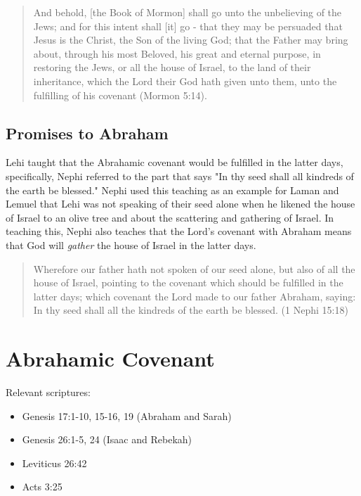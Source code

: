\begin{quotation}
And behold, [the Book of Mormon] shall go unto the unbelieving of the Jews; and for this intent shall [it] go - that they may be persuaded that Jesus is the Christ, the Son of the living God; that the Father may bring about, through his most Beloved, his great and eternal purpose, in restoring the Jews, or all the house of Israel, to the land of their inheritance, which the Lord their God hath given unto them, unto the fulfilling of his covenant (Mormon 5:14).
\end{quotation}

\subsection{Promises to Abraham}

Lehi taught that the Abrahamic covenant would be fulfilled in the latter days, specifically, Nephi referred to the part that says "In thy seed shall all kindreds of the earth be blessed." Nephi used this teaching as an example for Laman and Lemuel that Lehi was not speaking of their seed alone when he likened the house of Israel to an olive tree and about the scattering and gathering of Israel. In teaching this, Nephi also teaches that the Lord's covenant with Abraham means that God will \textit{gather} the house of Israel in the latter days.

\begin{quotation}
Wherefore our father hath not spoken of our seed alone, but also of all the house of Israel, pointing to the covenant which should be fulfilled in the latter days; which covenant the Lord made to our father Abraham, saying: In thy seed shall all the kindreds of the earth be blessed. (1 Nephi 15:18)
\end{quotation}

\section{Abrahamic Covenant}
Relevant scriptures:
\begin{itemize}
  \item Genesis 17:1-10, 15-16, 19 (Abraham and Sarah)
  \item Genesis 26:1-5, 24 (Isaac and Rebekah)
  \item Leviticus 26:42
  \item Acts 3:25
\end{itemize}
